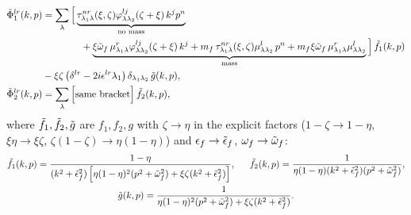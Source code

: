 \documentclass[9pt]{article}
\numberwithin{equation}{section}
\begin{document}
\begin{align}\label{eq:Phielq}
\Tilde{\Phi}^{lr}_{1}(k,p) & = \sum_{\lambda}\Big[\underbrace{\tau^{nr}_{\lambda_{1}\lambda}(\xi,\zeta)\varphi^{lj}_{\lambda\lambda_{2}}(\zeta+\xi)\,k^{j}p^{n}}_{\text{no mass}}\notag \\ & \hspace{4em}+\underbrace{\xi\Tilde{\omega}_{f}\,\mu^{r}_{\lambda_{1}\lambda}\varphi^{lj}_{\lambda\lambda_{2}}(\zeta+\xi)\,k^{j}+m_{f}\,\tau^{nr}_{\lambda_{1}\lambda}(\xi,\zeta)\mu^{l}_{\lambda\lambda_{2}}\,p^{n}+m_{f}\xi\Tilde{\omega}_{f}\,\mu^{r}_{\lambda_{1}\lambda}\mu^{l}_{\lambda\lambda_{2}}}_{\text{mass}}\Big]\,\Tilde{f}_{1}(k,p)\notag \\ & -\xi\zeta\left(\delta^{lr}-2i\epsilon^{lr}\lambda_{1}\right)\delta_{\lambda_{1}\lambda_{2}}\,\Tilde{g}(k,p),\notag \\
\Tilde{\Phi}^{lr}_{2}(k,p) & = \sum_{\lambda}\Big[\text{same bracket}\Big]\,\Tilde{f}_{2}(k,p),
\end{align}
where $\Tilde{f}_{1},\Tilde{f}_{2},\Tilde{g}$ are $f_{1},f_{2},g$ with $\zeta\rightarrow\eta$ in the explicit factors ($1-\zeta\rightarrow1-\eta$, $\xi\eta\rightarrow\xi\zeta$, $\zeta(1-\zeta)\rightarrow\eta(1-\eta)$) and $\epsilon_{f}\rightarrow\Tilde{\epsilon}_{f}$, $\omega_{f}\rightarrow\Tilde{\omega}_{f}$:
\begin{gather*}\Tilde{f}_{1}(k,p) = \frac{1-\eta}{(k^{2}+\Tilde{\epsilon}^{2}_{f})\left[\eta(1-\eta)^{2}(p^{2}+\Tilde{\omega}^{2}_{f})+\xi\zeta(k^{2}+\Tilde{\epsilon}^{2}_{f})\right]},\hspace{1.5em} \Tilde{f}_{2}(k,p) = \frac{1}{\eta(1-\eta)(k^{2}+\Tilde{\epsilon}^{2}_{f})(p^{2}+\Tilde{\omega}^{2}_{f})},\\ \Tilde{g}(k,p) = \frac{1}{\eta(1-\eta)^{2}(p^{2}+\Tilde{\omega}^{2}_{f})+\xi\zeta(k^{2}+\Tilde{\epsilon}^{2}_{f})}.\end{gather*}
\end{document}
